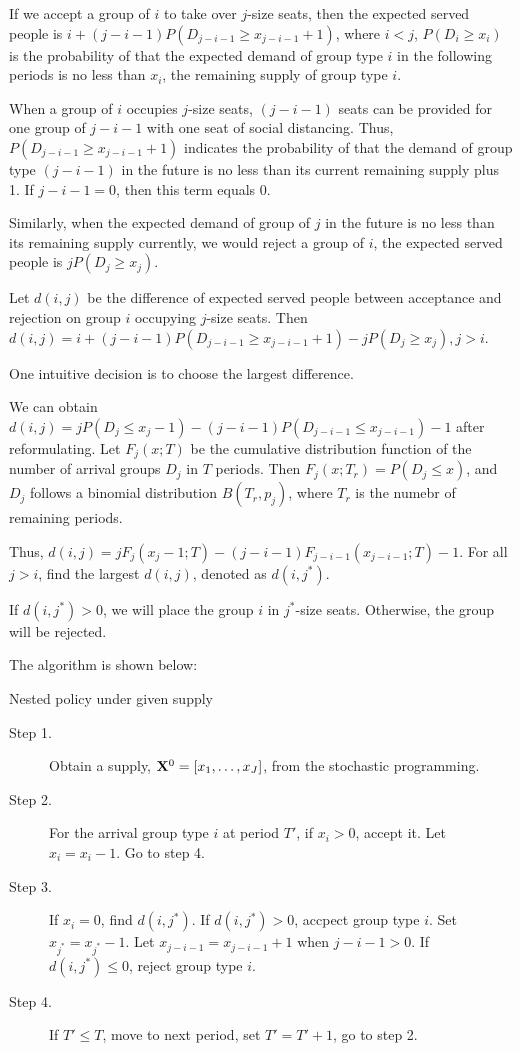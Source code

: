 If we accept a group of $i$ to take over $j$-size seats, then the expected served people is $i + (j-i-1)P(D_{j-i-1} \geq x_{j-i-1}+1)$, where $i < j$, $P(D_i \geq x_i)$ is the probability of that the expected demand of group type $i$ in the following periods is no less than $x_i$, the remaining supply of group type $i$.

When a group of $i$ occupies $j$-size seats, $(j-i-1)$ seats can be provided for one group of $j-i-1$ with one seat of social distancing.
Thus, $P(D_{j-i-1} \geq x_{j-i-1}+1)$ indicates the probability of that the demand of group type $(j-i-1)$ in the future is no less than its current remaining supply plus 1. If $j -i-1 =0$, then this term equals 0.

Similarly, when the expected demand of group of $j$ in the future is no less than its remaining supply currently, we would reject a group of $i$, the expected served people is $j P(D_{j} \geq x_{j})$.

Let $d(i,j)$ be the difference of expected served people between acceptance and rejection on group $i$ occupying $j$-size seats. Then $d(i,j) = i + (j-i-1)P(D_{j-i-1} \geq x_{j-i-1}+1) - j P(D_{j} \geq x_{j}), j >i$.

One intuitive decision is to choose the largest difference.

We can obtain $d(i,j) = j P(D_{j} \leq x_{j} -1) - (j-i-1)P(D_{j-i-1} \leq x_{j-i-1}) -1$ after reformulating. 
Let $F_{j}(x;T)$ be the cumulative distribution function of the number of arrival groups $D_{j}$ in $T$ periods. Then $F_{j}(x; T_{r}) = P(D_{j} \leq x)$, and $D_{j}$ follows a binomial distribution $B(T_{r}, p_{j})$, where $T_{r}$ is the numebr of remaining periods.

Thus, $d(i,j) = j F_{j}(x_{j}-1; T) - (j-i-1) F_{j-i-1}(x_{j-i-1}; T) -1$. For all $j >i$, find the largest $d(i,j)$, denoted as $d(i,j^{*})$.

If $d(i,j^{*}) >0$, we will place the group $i$ in $j^{*}$-size seats. Otherwise, the group will be rejected.

The algorithm is shown below:

\begin{algorithm}[H]
  \caption{Nested policy under given supply}\label{algo_nested_policy}
  \begin{description}
    \item[Step 1.] Obtain a supply, $\mathbf{X}^{0} = [x_1,\ldots,x_{J}]$, from the stochastic programming.
    \item[Step 2.] For the arrival group type $i$ at period $T{'}$, if $x_{i} > 0$, accept it. Let $x_{i} = x_{i} -1$. Go to step 4.
    \item[Step 3.] If $x_{i} = 0$, find $d(i,j^{*})$. If $d(i,j^{*})>0$, accpect group type $i$. Set $x_{j^{*}} = x_{j^{*}} -1$. Let $x_{j-i-1} = x_{j-i-1} + 1$ when $j-i-1>0$. If $d(i,j^{*}) \leq 0$, reject group type $i$.
    \item[Step 4.] If $T{'} \leq T$, move to next period, set $T{'} = T{'}+1$, go to step 2.
  \end{description}
\end{algorithm}

